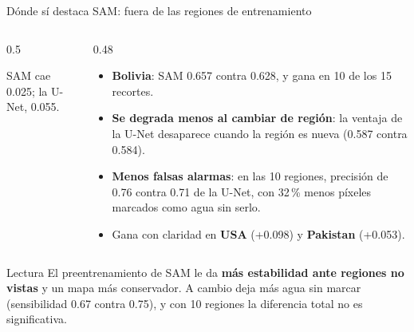 \documentclass[10pt,aspectratio=1610]{beamer}
\begin{document}
\begin{frame}{Dónde sí destaca SAM: fuera de las regiones de entrenamiento}
  \begin{columns}[T]
    \begin{column}{0.5\textwidth}
      {\scriptsize SAM cae 0.025; la U-Net, 0.055.}
    \end{column}
    \begin{column}{0.48\textwidth}
      \small
      \begin{itemize}
        \item \textbf{Bolivia}: SAM 0.657 contra 0.628, y gana en 10 de los 15 recortes.
        \item \textbf{Se degrada menos al cambiar de región}: la ventaja de la U-Net desaparece cuando la región es nueva (0.587 contra 0.584).
        \item \textbf{Menos falsas alarmas}: en las 10 regiones, precisión de 0.76 contra 0.71 de la U-Net, con 32\,\% menos píxeles marcados como agua sin serlo.
        \item Gana con claridad en \textbf{USA} (+0.098) y \textbf{Pakistan} (+0.053).
      \end{itemize}
    \end{column}
  \end{columns}
  \vspace{1mm}
  \begin{block}{Lectura}
    \small El preentrenamiento de SAM le da \textbf{más estabilidad ante regiones no vistas} y un mapa más conservador. A cambio deja más agua sin marcar (sensibilidad 0.67 contra 0.75), y con 10 regiones la diferencia total no es significativa.
  \end{block}
\end{frame}
\end{document}
